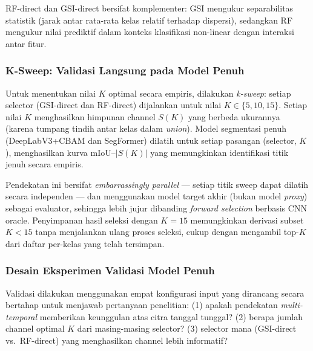 RF-direct dan GSI-direct bersifat komplementer: GSI mengukur separabilitas statistik (jarak antar rata-rata kelas relatif terhadap dispersi), sedangkan RF mengukur nilai prediktif dalam konteks klasifikasi non-linear dengan interaksi antar fitur.

\subsubsection{K-Sweep: Validasi Langsung pada Model Penuh}
\label{subsubsec:ksweep}

Untuk menentukan nilai $K$ optimal secara empiris, dilakukan \textit{k-sweep}: setiap selector (GSI-direct dan RF-direct) dijalankan untuk nilai $K \in \{5, 10, 15\}$.
Setiap nilai $K$ menghasilkan himpunan channel $S(K)$ yang berbeda ukurannya (karena tumpang tindih antar kelas dalam \textit{union}).
Model segmentasi penuh (DeepLabV3+CBAM dan SegFormer) dilatih untuk setiap pasangan (selector, $K$), menghasilkan kurva mIoU--$|S(K)|$ yang memungkinkan identifikasi titik jenuh secara empiris.

Pendekatan ini bersifat \textit{embarrassingly parallel} — setiap titik sweep dapat dilatih secara independen — dan menggunakan model target akhir (bukan model \textit{proxy}) sebagai evaluator, sehingga lebih jujur dibanding \textit{forward selection} berbasis CNN oracle.
Penyimpanan hasil seleksi dengan $K = 15$ memungkinkan derivasi subset $K < 15$ tanpa menjalankan ulang proses seleksi, cukup dengan mengambil top-$K$ dari daftar per-kelas yang telah tersimpan.

\subsubsection{Desain Eksperimen Validasi Model Penuh}
\label{subsec:stage3_validation}

Validasi dilakukan menggunakan empat konfigurasi input yang dirancang secara bertahap untuk menjawab pertanyaan penelitian:
(1) apakah pendekatan \textit{multi-temporal} memberikan keunggulan atas citra tanggal tunggal?
(2) berapa jumlah channel optimal $K$ dari masing-masing selector?
(3) selector mana (GSI-direct vs.\ RF-direct) yang menghasilkan channel lebih informatif?


